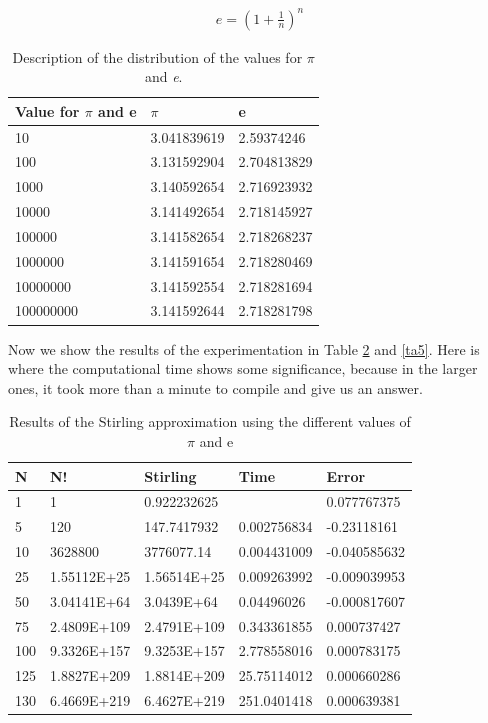 \documentclass{article}
\begin{document}
\begin{eqnarray}
\label{eq7}
e = (1 + \frac{1}{n})^n
\end{eqnarray}
 
  \begin{table}[h!]
\centering
 \caption{Description of the distribution of the values for $\pi$ and \textit{e}.} 
 \label{ta3}
 \begin{tabular} {| l | l | l | }
 \hline
\textbf{Value for $\pi$ and e}	&	\textbf{$\pi$}	&	\textbf{e} \\
\hline				
10	&	3.041839619	&	2.59374246\\
\hline
100	&	3.131592904	&	2.704813829\\
\hline
1000	&	3.140592654	&	2.716923932\\
\hline
10000	&	3.141492654	&	2.718145927\\
\hline
100000	&	3.141582654	&	2.718268237\\
\hline
1000000	&	3.141591654	&	2.718280469\\
\hline
10000000	&	3.141592554	&	2.718281694\\ 
\hline
100000000	&	3.141592644	&	2.718281798\\

\hline
 \end{tabular}
 \end{table}
 
 Now we show the results of the experimentation in Table \ref{ta4} and \ref{ta5}. Here is where the computational time shows some significance, because in the larger ones, it took more than a minute to compile and give us an answer.\\
 
 
   \begin{table}[h!]
\centering
 \caption{Results of the Stirling approximation using the different values of $\pi$ and e} 
 \label{ta4}
 \begin{tabular} {| l | l | l | l | l | }
 \hline
\textbf{N}	&	\textbf{N!}	&	\textbf{Stirling}	&	\textbf{Time}	&	\textbf{Error}	\\
\hline
1	&	1	&	0.922232625	&		&	0.077767375	\\
\hline
5	&	120	&	147.7417932	&	0.002756834	&	-0.23118161	\\
\hline
10	&	3628800	&	3776077.14	&	0.004431009	&	-0.040585632	\\
\hline
25	&	1.55112E+25	&	1.56514E+25	&	0.009263992	&	-0.009039953	\\
\hline
50	&	3.04141E+64	&	3.0439E+64	&	0.04496026	&	-0.000817607	\\
\hline
75	&	2.4809E+109	&	2.4791E+109	&	0.343361855	&	0.000737427	\\
\hline
100	&	9.3326E+157	&	9.3253E+157	&	2.778558016	&	0.000783175	\\
\hline
125	&	1.8827E+209	&	1.8814E+209	&	25.75114012	&	0.000660286	\\
\hline
130	&	6.4669E+219	&	6.4627E+219	&	251.0401418	&	0.000639381	\\
\hline
 \end{tabular}
 \end{table}
 
\end{document}
